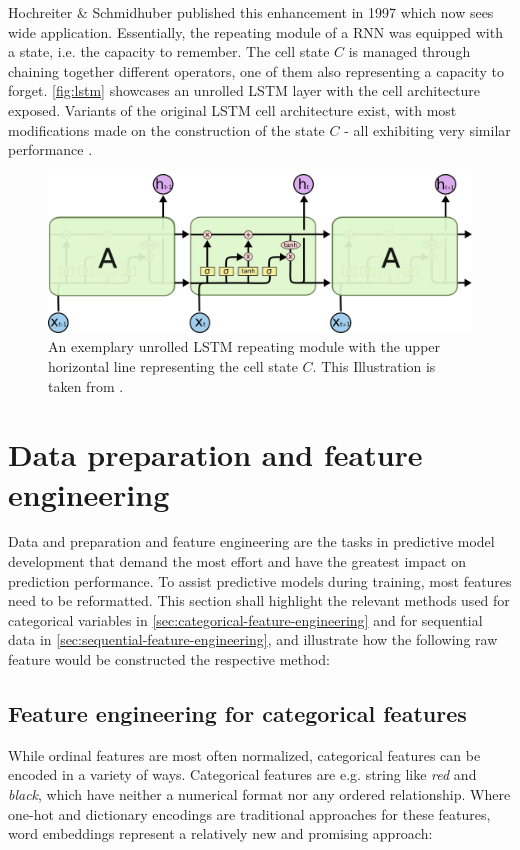 Hochreiter \& Schmidhuber published this enhancement in 1997 \cite{hochreiter1997} which now sees wide application. Essentially, the repeating module of a RNN was equipped with a state, i.e. the capacity to remember. The cell state $C$ is managed through chaining together different operators, one of them also representing a capacity to forget. \autoref{fig:lstm} showcases an unrolled LSTM layer with the cell architecture exposed. Variants of the original LSTM cell architecture exist, with most modifications made on the construction of the state $C$ - all exhibiting very similar performance \cite{greff2017lstm}.

\begin{figure}[ht!]
    \centering
    \includegraphics[width=.8\textwidth]{gfx/lstm-chain.png}
    \caption{An exemplary unrolled LSTM repeating module with the upper horizontal line representing the cell state $C$. This Illustration is taken from \cite{web:colah}.}
    \label{fig:lstm}
\end{figure}

\section{Data preparation and feature engineering}
Data and preparation and feature engineering are the tasks in predictive model development that demand the most effort and have the greatest impact on prediction performance. To assist predictive models during training, most features need to be reformatted. This section shall highlight the relevant methods used for categorical variables in \autoref{sec:categorical-feature-engineering} and for sequential data in \autoref{sec:sequential-feature-engineering}, and illustrate how the following raw feature would be constructed the respective method:

\subsection{Feature engineering for categorical features}
\label{sec:categorical-feature-engineering}
While ordinal features are most often normalized, categorical features can be encoded in a variety of ways. Categorical features are e.g. string like \textit{red} and \textit{black}, which have neither a numerical format nor any ordered relationship. Where one-hot and dictionary encodings are traditional approaches for these features, word embeddings represent a relatively new and promising approach:

